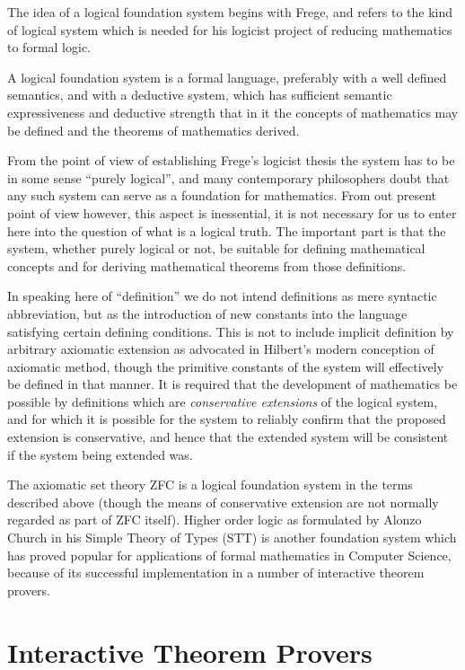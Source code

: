 The idea of a logical foundation system begins with Frege, and refers
to the kind of logical system which is needed for his logicist project
of reducing mathematics to formal logic.

A logical foundation system is a formal language, preferably with a
well defined semantics, and with a deductive system, which has
sufficient semantic expressiveness and deductive strength that in it
the concepts of mathematics may be defined and the theorems of
mathematics derived.

From the point of view of establishing Frege's logicist thesis the
system has to be in some sense ``purely logical'', and many
contemporary philosophers doubt that any such system can serve as a
foundation for mathematics.
From out present point of view however, this aspect is inessential, it
is not necessary for us to enter here into the question of what is a
logical truth.
The important part is that the system, whether purely logical or not,
be suitable for defining mathematical concepts and for deriving
mathematical theorems from those definitions.

In speaking here of  ``definition'' we do not intend definitions as
mere syntactic abbreviation, but as the introduction of new constants
into the language satisfying certain defining conditions.
This is not to include implicit definition by arbitrary axiomatic
extension as advocated in Hilbert's modern conception of axiomatic
method, though the primitive constants of the system will effectively
be defined in that manner.
It is required that the development of mathematics be possible by
definitions which are \emph{conservative extensions} of the logical
system, and for which it is possible for the system to reliably
confirm that the proposed extension is conservative, and hence that
the extended system will be consistent if the system being extended
was.

The axiomatic set theory ZFC is a logical foundation system
in the terms described above (though the means of conservative
extension are not normally regarded as part of ZFC itself).
Higher order logic as formulated by Alonzo Church in his Simple Theory of Types
(STT) is another foundation system which has proved popular
for applications of formal mathematics in Computer Science, because of
its successful implementation in a number of interactive theorem provers.

\section{Interactive Theorem Provers}


